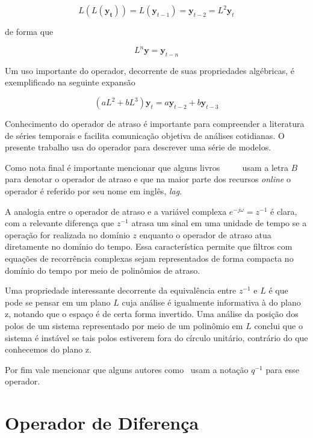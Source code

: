 \vspace{1cm}

$$L(L(\mathbf{y_t})) = L(\mathbf{y}_{t-1}) = \mathbf{y}_{t-2} = L^2 \mathbf{y}_{t}$$

\vspace{1cm}

de forma que

$$ L^n {\mathbf{y}} =  \mathbf{y}_{t-n}$$

\vspace{1cm}

Um uso importante do operador, decorrente de suas propriedades algébricas, é
exemplificado na seguinte expansão

$$ (aL^2 + bL^3) \mathbf{y}_{t} =  a\mathbf{y}_{t-2} + b\mathbf{y}_{t-3}$$

Conhecimento do operador de atraso é importante para compreender a literatura
de séries temporais e facilita comunicação objetiva de análises cotidianas.
O presente trabalho usa do operador para descrever uma série de modelos.

Como nota final é importante mencionar que alguns livros~~\cite{chatfield}
~~\cite{stoffer} usam a letra $B$ para denotar o operador de atraso e que na
maior parte dos recursos \emph{online} o operador é referido por seu nome em
inglês, \emph{lag}.

A analogia entre o operador de atraso e a variável complexa $e^{-j\omega} = z^{-1}$
é clara, com a relevante diferença que $z^{-1}$ atrasa um sinal em uma unidade
de tempo se a operação for realizada no domínio $z$ enquanto o operador de
atraso atua diretamente no domínio do tempo. Essa característica permite que
filtros com equações de recorrência complexas sejam representados de forma
compacta no domínio do tempo por meio de polinômios de atraso.

Uma propriedade interessante decorrente da equivalência entre $z^{-1}$ e $L$ é
que pode se pensar em um plano $L$ cuja análise é igualmente informativa à do
plano z, notando que o espaço é de certa forma invertido. Uma análise da
posição dos polos de um sistema representado por meio de um polinômio em $L$
conclui que o sistema é instável se tais polos estiverem fora do círculo unitário,
contrário do que conhecemos do plano z.

Por fim vale mencionar que alguns autores como~\cite{aguirre} usam a notação $q^{-1}$
para esse operador.

\section{Operador de Diferença}\label{sec:diff}

